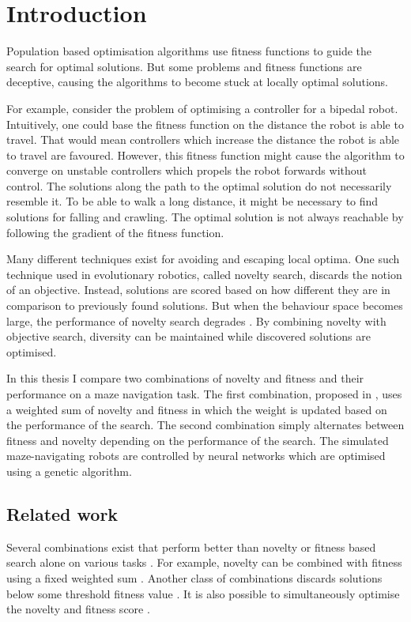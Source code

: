\section{Introduction}

\label{sec:intro}

Population based optimisation algorithms use fitness functions to guide the search for optimal solutions.
But some problems and fitness functions are deceptive, causing the algorithms to become stuck at
locally optimal solutions.

For example, consider the problem of optimising a controller for a bipedal
robot. Intuitively, one could base the fitness function on the distance the robot is able to travel.
That would mean controllers which increase the distance the robot is able to travel are favoured.
However, this fitness function might cause the algorithm to converge on unstable controllers which
propels the robot forwards without control. The solutions along the path to the optimal solution
do not necessarily resemble it. To be able to walk a long distance, it might be necessary to find
solutions for falling and crawling. The optimal solution is not always reachable by following
the gradient of the fitness function.

Many different techniques exist for avoiding and escaping local optima. One such technique used
in evolutionary robotics, called
novelty search, discards the notion of an objective. Instead, solutions are scored based on how different
they are in comparison to previously found solutions. But when the behaviour space becomes large, the performance
of novelty search degrades \cite{novelty_not_enough}. By combining novelty with objective search, diversity
can be maintained while discovered solutions are optimised.

In this thesis I compare two combinations of novelty and fitness and their performance
on a maze navigation task. The first combination, proposed in \cite{novelty_not_enough}, uses a weighted
sum of novelty and fitness in which the weight is updated based on the performance of the search.
The second combination simply alternates between fitness and novelty depending on the performance
of the search. The simulated maze-navigating robots are controlled by neural networks which are
optimised using a genetic algorithm.

\subsection{Related work}
Several combinations exist that perform better than novelty or fitness based search alone
on various tasks \cite{ns_study}. For example, novelty can be combined with fitness using a
fixed weighted sum \cite{novelty_not_enough}. Another class of combinations discards solutions below
some threshold fitness value \cite{minimal_ns}. It is also possible to simultaneously optimise
the novelty and fitness score \cite{multi_ns}.
